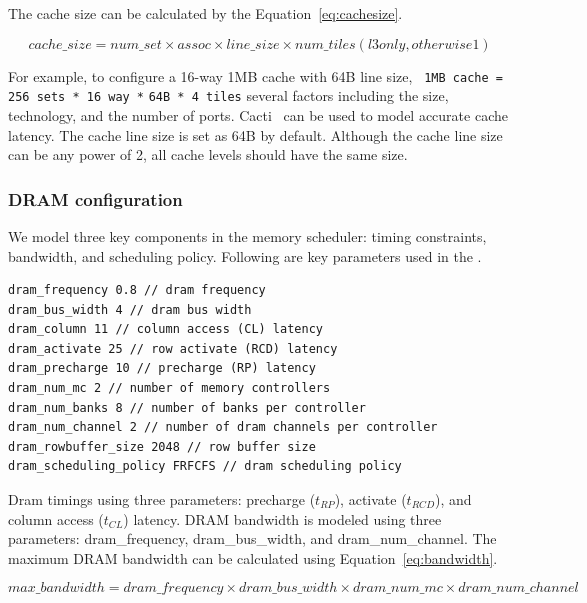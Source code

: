 The cache size can be calculated by the Equation~\ref{eq:cachesize}.

\begin{equation}
\label{eq:cachesize}
cache\_size = num\_set \times assoc \times line\_size \times num\_tiles (l3 only, otherwise 1)
\end{equation}



For example, to configure a 16-way 1MB cache with 64B line size,
\Verb+ 1MB cache = 256 sets * 16 way *+ \Verb+64B * 4 tiles+
several factors including the size, technology, and the number of
ports. Cacti~\cite{cacti} can be used to model accurate cache
latency. The cache line size is set as 64B by default. Although the
cache line size can be any power of 2, all cache levels should have
the same size.


\subsubsection{DRAM configuration}
\label{sec:param-dram}

We model three key components in the memory scheduler: timing
constraints, bandwidth, and scheduling policy. Following are key
parameters used in the \SIM.


\begin{Verbatim}
dram_frequency 0.8 // dram frequency
dram_bus_width 4 // dram bus width
dram_column 11 // column access (CL) latency
dram_activate 25 // row activate (RCD) latency
dram_precharge 10 // precharge (RP) latency
dram_num_mc 2 // number of memory controllers
dram_num_banks 8 // number of banks per controller
dram_num_channel 2 // number of dram channels per controller
dram_rowbuffer_size 2048 // row buffer size
dram_scheduling_policy FRFCFS // dram scheduling policy
\end{Verbatim}


Dram timings using three parameters: precharge ($t_{RP}$), activate
($t_{RCD}$), and column access ($t_{CL}$) latency. DRAM bandwidth is
modeled using three
parameters: \textsf{dram\_frequency}, \textsf{dram\_bus\_width},
and \textsf{dram\_num\_channel}. The maximum DRAM bandwidth can be
calculated using Equation~\ref{eq:bandwidth}.

\begin{equation}
\label{eq:bandwidth}
max\_bandwidth = dram\_frequency \times dram\_bus\_width \times dram\_num\_mc \times dram\_num\_channel 
\end{equation}

